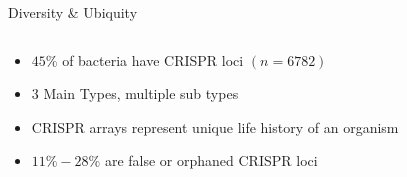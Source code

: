 \documentclass[dvipsnames]{beamer}
\begin{document}
\begin{frame}[fragile]{Diversity \& Ubiquity}
    \begin{columns}
    \begin{column}{0.5\textwidth}
        \begin{itemize}
            \item $45\%$ of bacteria have CRISPR loci $(n=6782)$ \autocite{crispdb}
            \item 3 Main Types, multiple sub types \autocite{acqorres}
            \item CRISPR arrays represent unique life history of an organism
            \item $11\%-28\%$ are false or orphaned CRISPR loci \autocite{ineqcas}
        \end{itemize}
    \end{column}
    \begin{column}{0.5\textwidth}
    \begin{figure}[htb!]
        \autocite{evocas}
    \end{figure}
    \end{column}
    \end{columns}
\end{frame}
\end{document}
